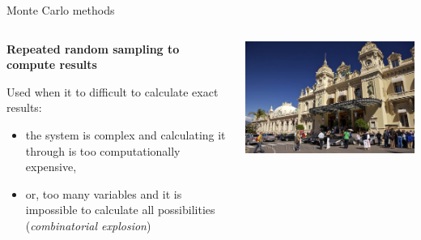 \documentclass[compress,xcolor=table]{beamer}
\begin{document}
\begin{frame}{Monte Carlo methods}

    \begin{columns}
        \begin{column}{0.5\linewidth}
            \textbf{Repeated random sampling to compute results}

            Used when it to difficult to calculate exact results:

            \begin{itemize}
                \item the system is complex and calculating it through is too
                    computationally expensive,
                \item or, too many variables and it is impossible to calculate all
                    possibilities (\emph{combinatorial explosion})
            \end{itemize}


        \end{column}
        \begin{column}{0.5\linewidth}
            \begin{center}
                \includegraphics[width=\linewidth]{montecarlo}
            \end{center}

        \end{column}
    \end{columns}

\end{frame}

\end{document}
